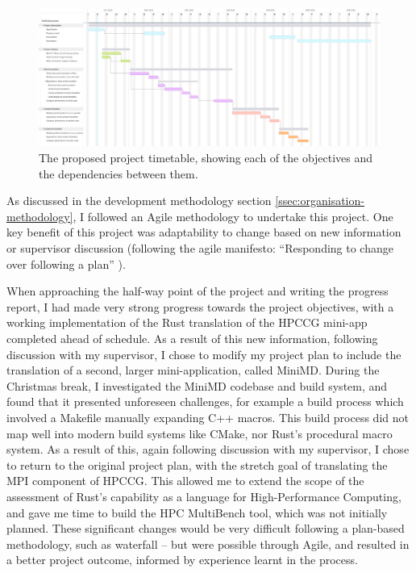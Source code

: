 \begin{figure}[h]
    \centering
    \includegraphics[width=\textwidth]{images/6_project_management/diss_gantt_spec_2.png}
    \caption{The proposed project timetable, showing each of the objectives and the dependencies between them.}
    \label{fig:diss_gantt_spec_2}
\end{figure}

As discussed in the development methodology section \ref{ssec:organisation-methodology}, I followed an Agile methodology to undertake this project. One key benefit of this project was adaptability to change based on new information or supervisor discussion (following the agile manifesto: ``Responding to change over following a plan'' \cite{beckManifestoAgileSoftware2001}). 

When approaching the half-way point of the project and writing the progress report, I had made very strong progress towards the project objectives, with a working implementation of the Rust translation of the HPCCG mini-app completed ahead of schedule. As a result of this new information, following discussion with my supervisor, I chose to modify my project plan to include the translation of a second, larger mini-application, called MiniMD. During the Christmas break, I investigated the MiniMD codebase and build system, and found that it presented unforeseen challenges, for example a build process which involved a Makefile manually expanding C++ macros. This build process did not map well into modern build systems like CMake, nor Rust's procedural macro system. As a result of this, again following discussion with my supervisor, I chose to return to the original project plan, with the stretch goal of translating the MPI component of HPCCG. This allowed me to extend the scope of the assessment of Rust's capability as a language for High-Performance Computing, and gave me time to build the HPC MultiBench tool, which was not initially planned. These significant changes would be very difficult following a plan-based methodology, such as waterfall -- but were possible through Agile, and resulted in a better project outcome, informed by experience learnt in the process.

